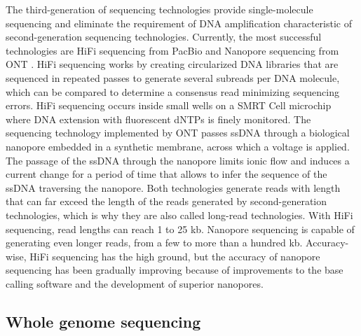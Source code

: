 The third-generation of sequencing technologies provide single-molecule sequencing and eliminate the requirement of \ac{DNA} amplification characteristic of second-generation sequencing technologies. Currently, the most successful technologies are HiFi sequencing from \ac{PacBio} \cite{wenger_accurate_2019, eid_real-time_2009} and Nanopore sequencing from \ac{ONT} \cite{mikheyev_first_2014, stoddart_single-nucleotide_2009}. HiFi sequencing works by creating circularized \ac{DNA} libraries that are sequenced in repeated passes to generate several subreads per \ac{DNA} molecule, which can be compared to determine a consensus read minimizing sequencing errors. HiFi sequencing occurs inside small wells on a \ac{SMRT} Cell microchip where \ac{DNA} extension with fluorescent dNTPs is finely monitored. The sequencing technology implemented by \ac{ONT} passes \ac{ssDNA} through a biological nanopore embedded in a synthetic membrane, across which a voltage is applied. The passage of the \ac{ssDNA} through the nanopore limits ionic flow and induces a current change for a period of time that allows to infer the sequence of the \ac{ssDNA} traversing the nanopore. Both technologies generate reads with length that can far exceed the length of the reads generated by second-generation technologies, which is why they are also called long-read technologies. With HiFi sequencing, read lengths can reach 1 to 25 \ac{kb}. Nanopore sequencing is capable of generating even longer reads, from a few to more than a hundred \ac{kb}. Accuracy-wise, HiFi sequencing has the high ground, but the accuracy of nanopore sequencing has been gradually improving because of improvements to the base calling software and the development of superior nanopores.

\subsection{Whole genome sequencing}

